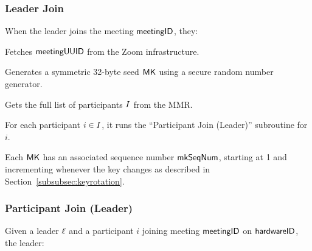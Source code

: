 \subsubsection{Leader Join}\label{subsubsec:leaderjoin}

When the leader joins the meeting ${\sf meetingID}$, they:

\begingroup
\RaggedRight
\begin{enumerate*}
\item Fetches ${\sf meetingUUID}$ from the Zoom infrastructure.
\item Generates a symmetric 32-byte seed ${\sf MK}$ using a secure random number generator.
\item Gets the full list of participants $I$ from the MMR.
\item For each participant $i \in I$, it runs the ``Participant Join (Leader)'' subroutine for $i$.
\end{enumerate*}
\endgroup

Each ${\sf MK}$ has an associated sequence number $\mathsf{mkSeqNum}$, starting at 1 and incrementing
whenever the key changes as described in Section~\ref{subsubsec:keyrotation}.

\subsubsection{Participant Join (Leader)}
\label{subsubsec:participantjoinleader}

Given a leader $\ell$ and a participant $i$ joining meeting ${\sf meetingID}$ on ${\sf hardwareID}$, the leader:

